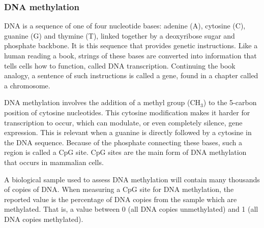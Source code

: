 \documentclass{article}
\begin{document}
\subsubsection{DNA methylation}
DNA is a sequence of one of four nucleotide bases: adenine (A), cytosine (C), guanine (G) and thymine (T), linked together by a deoxyribose sugar and phosphate backbone. It is this sequence that provides genetic instructions. Like a human reading a book, strings of these bases are converted into information that tells cells how to function, called DNA transcription. Continuing the book analogy, a sentence of such instructions is called a gene, found in a chapter called a chromosome.

DNA methylation involves the addition of a methyl group (CH\(_3\)) to the 5-carbon position of cytosine nucleotides. This cytosine modification makes it harder for transcription to occur, which can modulate, or even completely silence, gene expression. This is relevant when a guanine is directly followed by a cytosine in the DNA sequence. Because of the phosphate connecting these bases, such a region is called a CpG site. CpG sites are the main form of DNA methylation that occurs in mammalian cells.

A biological sample used to assess DNA methylation will contain many thousands of copies of DNA. When measuring a CpG site for DNA methylation, the reported value is the percentage of DNA copies from the sample which are methylated. That is, a value between 0 (all DNA copies unmethylated) and 1 (all DNA copies methylated).

\end{document}
